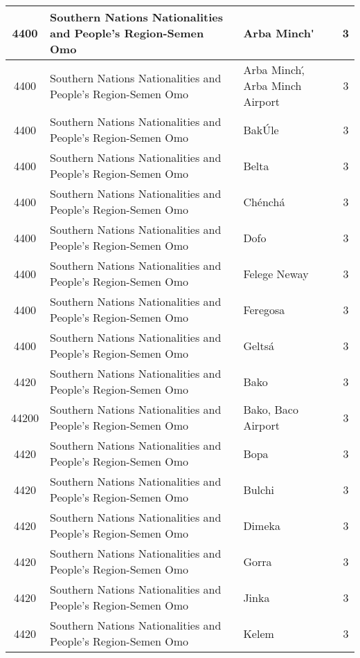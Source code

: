 \documentclass[12pt,a4paper]{report}
\begin{document}
\begin{tabular}{|c|l|l|c|}
\hline 
\rule[-1ex]{0pt}{2.5ex} 4400 & Southern Nations Nationalities and People's Region-Semen Omo & Arba Minch\' & 3 \\ 
\hline 
\rule[-1ex]{0pt}{2.5ex} 4400 & Southern Nations Nationalities and People's Region-Semen Omo & Arba Minch\', Arba Minch Airport & 3 \\ 
\hline 
\rule[-1ex]{0pt}{2.5ex} 4400 & Southern Nations Nationalities and People's Region-Semen Omo & Bak\'Ule & 3 \\ 
\hline 
\rule[-1ex]{0pt}{2.5ex} 4400 & Southern Nations Nationalities and People's Region-Semen Omo & Belta & 3 \\ 
\hline 
\rule[-1ex]{0pt}{2.5ex} 4400 & Southern Nations Nationalities and People's Region-Semen Omo & Ch\'ench\'a & 3 \\  
\hline 
\rule[-1ex]{0pt}{2.5ex} 4400 & Southern Nations Nationalities and People's Region-Semen Omo & Dofo & 3 \\ 
\hline 
\rule[-1ex]{0pt}{2.5ex} 4400 & Southern Nations Nationalities and People's Region-Semen Omo & Felege Neway & 3 \\ 
\hline 
\rule[-1ex]{0pt}{2.5ex} 4400 & Southern Nations Nationalities and People's Region-Semen Omo & Feregosa & 3 \\  
\hline 
\rule[-1ex]{0pt}{2.5ex} 4400 & Southern Nations Nationalities and People's Region-Semen Omo & Gelts\'a & 3 \\  
\hline 
\rule[-1ex]{0pt}{2.5ex} 4420 & Southern Nations Nationalities and People's Region-Semen Omo & Bako & 3 \\ 
\hline 
\rule[-1ex]{0pt}{2.5ex} 44200 & Southern Nations Nationalities and People's Region-Semen Omo & Bako, Baco Airport & 3 \\ 
\hline 
\rule[-1ex]{0pt}{2.5ex} 4420 & Southern Nations Nationalities and People's Region-Semen Omo & Bopa & 3 \\
\hline 
\rule[-1ex]{0pt}{2.5ex} 4420 & Southern Nations Nationalities and People's Region-Semen Omo & Bulchi & 3 \\
\hline 
\rule[-1ex]{0pt}{2.5ex} 4420 & Southern Nations Nationalities and People's Region-Semen Omo & Dimeka & 3 \\
\hline 
\rule[-1ex]{0pt}{2.5ex} 4420 & Southern Nations Nationalities and People's Region-Semen Omo & Gorra & 3 \\
\hline 
\rule[-1ex]{0pt}{2.5ex} 4420 & Southern Nations Nationalities and People's Region-Semen Omo & Jinka & 3 \\
\hline 
\rule[-1ex]{0pt}{2.5ex} 4420 & Southern Nations Nationalities and People's Region-Semen Omo & Kelem & 3 \\

\end{tabular}
\end{document}
